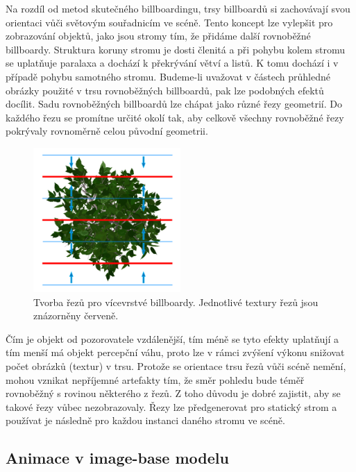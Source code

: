 Na rozdíl od metod skutečného billboardingu, trsy billboardů si zachovávají svou orientaci vůči světovým souřadnicím ve scéně. Tento koncept lze vylepšit pro zobrazování objektů, jako jsou stromy tím, že přidáme další rovnoběžné billboardy. Struktura koruny stromu je dosti členitá a při pohybu kolem stromu se uplatňuje paralaxa a dochází k překrývání větví a listů. K tomu dochází i v případě pohybu samotného stromu. Budeme-li uvažovat v částech průhledné obrázky použité v trsu rovnoběžných billboardů, pak lze podobných efektů docílit. Sadu rovnoběžných billboardů lze chápat jako různé řezy geometrií. Do každého řezu se promítne určité okolí tak, aby celkově všechny rovnoběžné řezy pokrývaly rovnoměrně celou původní geometrii.
\begin{figure}[!hbt]
\begin{center}
\includegraphics[width=0.5\textwidth]{./figures/slices.png}
\caption{ Tvorba řezů pro vícevrstvé billboardy. Jednotlivé textury řezů jsou znázorněny červeně. }
\end{center}
\label{fig:slicing}
\end{figure}
Čím je objekt od pozorovatele vzdálenější, tím méně se tyto efekty uplatňují a tím menší má objekt percepční váhu, proto lze v rámci zvýšení výkonu snižovat počet obrázků (textur) v trsu.
Protože se orientace trsu řezů vůči scéně nemění, mohou vznikat nepříjemné artefakty tím, že směr pohledu bude téměř rovnoběžný s rovinou některého z řezů. Z toho důvodu je dobré zajistit, aby se takové řezy vůbec nezobrazovaly.
Řezy lze předgenerovat pro statický strom a používat je následně pro každou instanci daného stromu ve scéně.


\subsection{Animace v image-base modelu}
\label{sec-ibAnimation}

